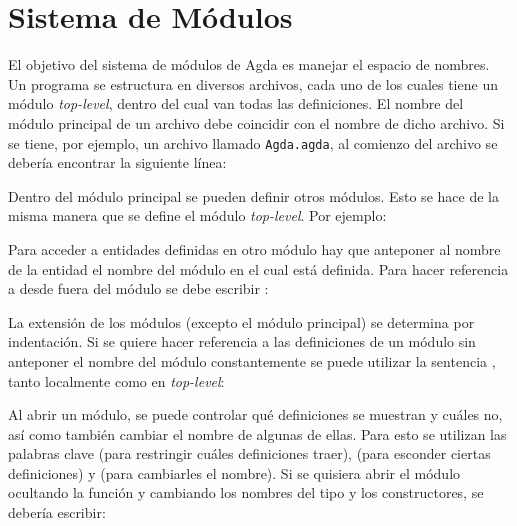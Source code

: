 
\section{Sistema de Módulos}\label{agda:modules}

El objetivo del sistema de módulos de Agda es manejar el espacio de nombres. Un programa se estructura en diversos archivos, cada uno de los cuales tiene un módulo \textit{top-level}, dentro del cual van todas las definiciones. El nombre del módulo principal de un archivo debe coincidir con el nombre de dicho archivo. Si se tiene, por ejemplo, un archivo llamado \texttt{Agda.agda}, al comienzo del archivo se debería encontrar la siguiente línea:


Dentro del módulo principal se pueden definir otros módulos. Esto se hace de la misma manera que se define el módulo \textit{top-level}. Por ejemplo:


Para acceder a entidades definidas en otro módulo hay que anteponer al nombre de la entidad el nombre del módulo en el cual está definida. Para hacer referencia a  desde fuera del módulo  se debe escribir :




La extensión de los módulos (excepto el módulo principal) se determina por indentación. Si se quiere hacer referencia a las definiciones de un módulo sin anteponer el nombre del módulo constantemente se puede utilizar la sentencia , tanto localmente como en \textit{top-level}:






Al abrir un módulo, se puede controlar qué definiciones se muestran y cuáles no, así como también cambiar el nombre de algunas de ellas. Para esto se utilizan las palabras clave  (para restringir cuáles definiciones traer),  (para esconder ciertas definiciones) y  (para cambiarles el nombre). Si se quisiera abrir el módulo  ocultando la función  y cambiando los nombres del tipo y los constructores, se debería escribir:

